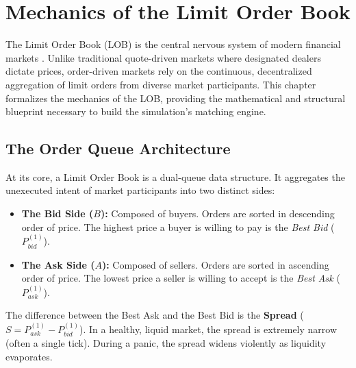 \chapter{Mechanics of the Limit Order Book}
\label{ch:mechanics_lob}

The Limit Order Book (LOB) is the central nervous system of modern financial markets \cite{ohara1995market}. Unlike traditional quote-driven markets where designated dealers dictate prices, order-driven markets rely on the continuous, decentralized aggregation of limit orders from diverse market participants. This chapter formalizes the mechanics of the LOB, providing the mathematical and structural blueprint necessary to build the simulation's matching engine.

\section{The Order Queue Architecture}

At its core, a Limit Order Book is a dual-queue data structure. It aggregates the unexecuted intent of market participants into two distinct sides:
\begin{itemize}
    \item \textbf{The Bid Side ($B$):} Composed of buyers. Orders are sorted in descending order of price. The highest price a buyer is willing to pay is the \textit{Best Bid} ($P_{bid}^{(1)}$).
    \item \textbf{The Ask Side ($A$):} Composed of sellers. Orders are sorted in ascending order of price. The lowest price a seller is willing to accept is the \textit{Best Ask} ($P_{ask}^{(1)}$).
\end{itemize}

The difference between the Best Ask and the Best Bid is the \textbf{Spread} ($S = P_{ask}^{(1)} - P_{bid}^{(1)}$). In a healthy, liquid market, the spread is extremely narrow (often a single tick). During a panic, the spread widens violently as liquidity evaporates.

